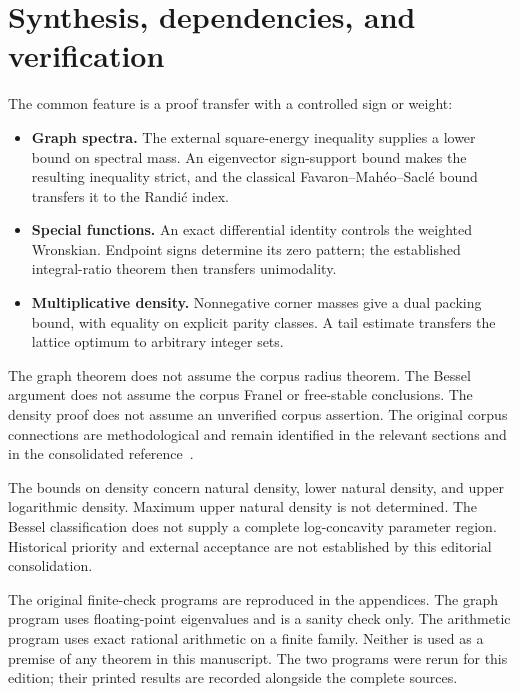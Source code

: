 \documentclass[11pt,a4paper]{article}
\theoremstyle{remark}\newtheorem{remark}[theorem]{Remark}
\numberwithin{equation}{section}
\begin{document}
\clearpage
\section{Synthesis, dependencies, and verification}
The common feature is a proof transfer with a controlled sign or weight:
\begin{itemize}
\item \textbf{Graph spectra.} The external square-energy inequality
supplies a lower bound on spectral mass. An eigenvector sign-support
bound makes the resulting inequality strict, and the classical
Favaron--Mah\'eo--Sacl\'e bound transfers it to the Randi\'c index.
\item \textbf{Special functions.} An exact differential identity controls
the weighted Wronskian. Endpoint signs determine its zero pattern;
the established integral-ratio theorem then transfers unimodality.
\item \textbf{Multiplicative density.} Nonnegative corner masses give a
dual packing bound, with equality on explicit parity classes. A tail
estimate transfers the lattice optimum to arbitrary integer sets.
\end{itemize}
The graph theorem does not assume the corpus radius theorem. The Bessel
argument does not assume the corpus Franel or free-stable conclusions.
The density proof does not assume an unverified corpus assertion.
The original corpus connections are methodological and remain identified
in the relevant sections and in the consolidated reference~\cite{VMRC}.

The bounds on density concern natural density, lower natural density,
and upper logarithmic density. Maximum upper natural density is not
determined. The Bessel classification does not supply a complete
log-concavity parameter region. Historical priority and external
acceptance are not established by this editorial consolidation.

The original finite-check programs are reproduced in the appendices.
The graph program uses floating-point eigenvalues and is a sanity check
only. The arithmetic program uses exact rational arithmetic on a finite
family. Neither is used as a premise of any theorem in this manuscript.
The two programs were rerun for this edition; their printed results are
recorded alongside the complete sources.

\appendix
\clearpage
\end{document}
